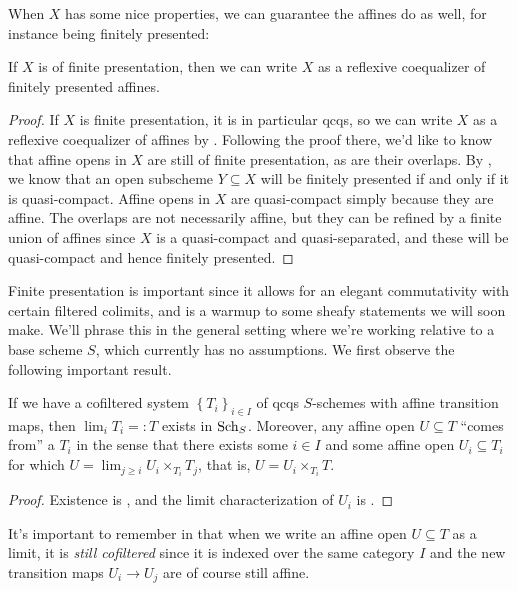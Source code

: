 \documentclass[11pt,openany]{book}
\begin{document}
When $X$ has some nice properties, we can guarantee the affines do as well, for instance being finitely presented:
\begin{proposition}\label{prop:fp-scheme-colimit-fp-affines}
If $X$ is of finite presentation, then we can write $X$ as a reflexive coequalizer of finitely presented affines.
\end{proposition}
\begin{proof} If $X$ is finite presentation, it is in particular qcqs, so we can write $X$ as a reflexive coequalizer of affines by . Following the proof there, we'd like to know that affine opens in $X$ are still of finite presentation, as are their overlaps. By \cite[01TU]{Stacks}, we know that an open subscheme $Y \subseteq X$ will be finitely presented if and only if it is quasi-compact. Affine opens in $X$ are quasi-compact simply because they are affine. The overlaps are not necessarily affine, but they can be refined by a finite union of affines since $X$ is a quasi-compact and quasi-separated, and these will be quasi-compact and hence finitely presented.
\end{proof}

Finite presentation is important since it allows for an elegant commutativity with certain filtered colimits, and is a warmup to some sheafy statements we will soon make. We'll phrase this in the general setting where we're working relative to a base scheme $S$, which currently has no assumptions. We first observe the following important result.






\begin{proposition}
\label{prop:limits-affine-local-on-target}
If we have a cofiltered system $\left\{ T_i \right\}_{i\in I}$ of qcqs $S$-schemes with affine transition maps, then $\lim_i T_i =: T$ exists in $\mathrm{Sch}_S$. Moreover, any affine open $U \subseteq T$ ``comes from'' a $T_i$ in the sense that there exists some $i\in I$ and some affine open $U_i \subseteq T_i$ for which $U = \lim_{j\ge i} U_i \times_{T_i}T_j$, that is, $U = U_i \times_{T_i} T$.
\end{proposition}
\begin{proof} Existence is \cite[01YW]{Stacks}, and the limit characterization of $U_i$ is \cite[01YZ]{Stacks}.
\end{proof}


It's important to remember in  that when we write an affine open $U \subseteq T$ as a limit, it is \emph{still cofiltered} since it is indexed over the same category $I$ and the new transition maps $U_i \to U_j$ are of course still affine.
\end{document}
